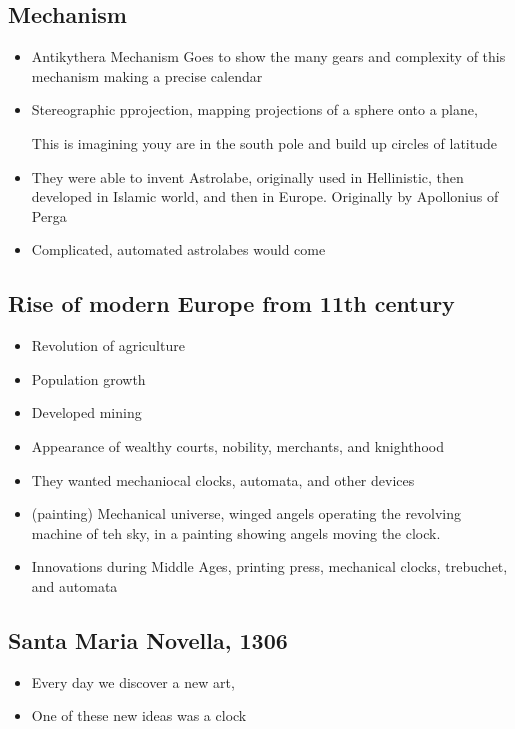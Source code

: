 \documentclass{article}
\begin{document}
\subsection{Mechanism}
\begin{itemize}
  \item Antikythera Mechanism Goes to show the many gears and complexity of this mechanism
    making a precise calendar
  \item Stereographic pprojection, mapping projections of a sphere onto a plane,

    This is imagining youy are in the south pole and build up circles of latitude
  \item They were able to invent Astrolabe, originally used in Hellinistic, then
    developed in Islamic world, and then in Europe. Originally by Apollonius of Perga
  \item Complicated, automated astrolabes would come
\end{itemize}

\subsection{Rise of modern Europe from 11th century}
\begin{itemize}
  \item Revolution of agriculture
  \item Population growth
  \item  Developed mining
  \item  Appearance of wealthy courts, nobility, merchants, and knighthood
  \item They wanted mechaniocal clocks, automata, and other devices
  \item (painting) Mechanical universe, winged angels operating the revolving
    machine of teh sky, in a painting showing angels moving the clock.
  \item Innovations during Middle Ages, printing press, mechanical clocks, trebuchet, and automata
\end{itemize}
\subsection{Santa Maria Novella, 1306}
\begin{itemize}
  \item Every day we discover a new art,
  \item One of these new ideas was a clock
\end{itemize}
\end{document}
